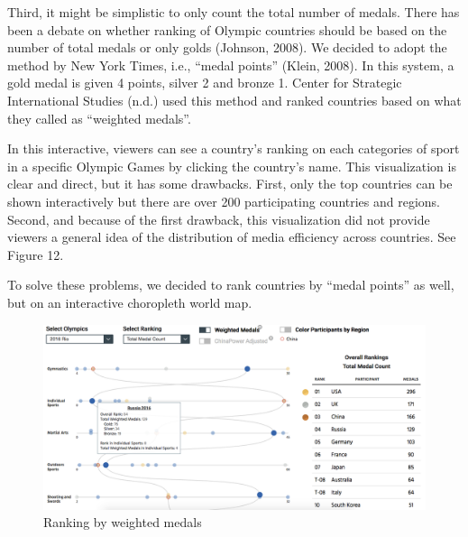 \documentclass[12pt]{article}
\begin{document}
Third, it might be simplistic to only count the total number of medals. There has been a debate on whether ranking of Olympic countries should be based on the number of total medals or only golds (Johnson, 2008). We decided to adopt the method by New York Times, i.e., “medal points” (Klein, 2008). In this system, a gold medal is given 4 points, silver 2 and bronze 1. Center for Strategic International Studies (n.d.) used this method and ranked countries based on what they called as “weighted medals”. 

In this interactive, viewers can see a country’s ranking on each categories of sport in a specific Olympic Games by clicking the country’s name. This visualization is clear and direct, but it has some drawbacks. First, only the top countries can be shown interactively but there are over 200 participating countries and regions. Second, and because of the first drawback, this visualization did not provide viewers a general idea of the distribution of media efficiency across countries. See Figure 12.

To solve these problems, we decided to rank countries by “medal points” as well, but on an interactive choropleth world map. 

\begin{figure}[!t]
    \centering
    \includegraphics[scale=0.35]{pics/3-7.png}
    \caption{Ranking by weighted medals}
    \label{fig:my_label}
\end{figure}
\end{document}
